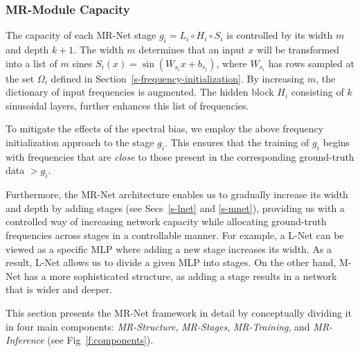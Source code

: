 \subsubsection{MR-Module Capacity}
\label{sec-module-capacity}

The capacity of each MR-Net stage $g_i=L_i\circ H_i\circ S_i$ is controlled by its width $m$ and depth $k+1$.
The width $m$ determines that an input $x$ will be transformed into a list of $m$ sines $S_i(x)=\sin\left(W_{s_i}x+b_{s_i}\right)$,
where $W_{s_i}$ has rows sampled at the set $\Omega_i$ defined in Section~\ref{s-frequency-initialization}. By increasing $m$, the dictionary of input frequencies is augmented. The hidden block $H_i$ consisting of $k$ sinusoidal layers, further enhances this list of frequencies.


To mitigate the effects of the spectral bias, we employ the above frequency initialization approach to the stage $g_i$. This ensures that the training of $g_i$ begins with frequencies that are \textit{close} to those present in the corresponding ground-truth data $\gt{g}_i$.

Furthermore, the MR-Net architecture enables us to gradually increase its width and depth by adding stages (see Secs~\ref{s-lnet} and \ref{s-mnet}), providing us with a controlled way of increasing network capacity while allocating ground-truth frequencies across stages in a controllable manner.
For example, a L-Net can be viewed as a specific MLP where adding a new stage increases its width. As a result, L-Net allows us to divide a given MLP into stages. On the other hand, M-Net has a more sophisticated structure, as adding a stage results in a network that is wider and deeper.



This section presents the MR-Net framework in detail by conceptually dividing it in four main components: \emph{MR-Structure}, \emph{MR-Stages}, \emph{MR-Training}, and \emph{MR-Inference} (see Fig~\ref{f:components}). 

